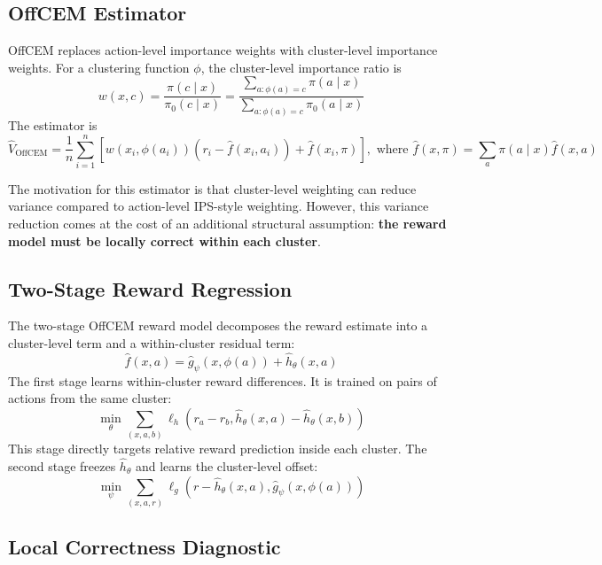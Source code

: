 \documentclass[11pt]{article}
\begin{document}
\subsection{OffCEM Estimator}

OffCEM replaces action-level importance weights with cluster-level importance weights. For a clustering function $\phi$, the cluster-level importance ratio is 
$$w(x,c) = \frac{\pi(c\mid x)}{\pi_0(c\mid x)} = \frac{\sum_{a:\phi(a)=c}\pi(a\mid x)}{\sum_{a:\phi(a)=c}\pi_0(a\mid x)}$$
The estimator is
$$\hat V_{\mathrm{OffCEM}} = \frac{1}{n} \sum_{i=1}^n \left[w(x_i,\phi(a_i))(r_i-\hat f(x_i,a_i)) + \hat f(x_i,\pi)
\right], \text{ where } \hat f(x,\pi)=\sum_a \pi(a\mid x)\hat f(x,a)$$

The motivation for this estimator is that cluster-level weighting can reduce variance compared to action-level IPS-style weighting. However, this variance reduction comes at the cost of an additional structural assumption: \textbf{the reward model must be locally correct within each cluster}.

\subsection{Two-Stage Reward Regression}

The two-stage OffCEM reward model decomposes the reward estimate into a cluster-level term and a within-cluster residual term:
$$ \hat f(x,a)=\hat g_\psi(x,\phi(a))+\hat h_\theta(x,a)$$
The first stage learns within-cluster reward differences. It is trained on pairs of actions from the same cluster:
$$ \min_\theta \sum_{(x,a,b)} \ell_h \left(r_a-r_b, \hat h_\theta(x,a)-\hat h_\theta(x,b)\right)$$
This stage directly targets relative reward prediction inside each cluster. The second stage freezes $\hat h_\theta$ and learns the cluster-level offset:
$$ \min_\psi \sum_{(x,a,r)} \ell_g \left(r-\hat h_\theta(x,a), \hat g_\psi(x,\phi(a)) \right)$$


\subsection{Local Correctness Diagnostic}
\end{document}
